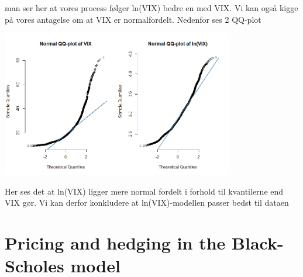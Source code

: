 \documentclass{article}
\theoremstyle{definition}
\theoremstyle{remark}
\begin{document}
man ser her at vores process følger ln(VIX) bedre en med VIX. Vi kan også kigge på vores antagelse om at VIX er normalfordelt. Nedenfor ses 2 QQ-plot
\begin{center}
    \includegraphics[width=4in]{Rplot17.png}
\end{center}
Her ses det at ln(VIX) ligger mere normal fordelt i forhold til kvantilerne end VIX gør. Vi kan derfor konkludere at ln(VIX)-modellen passer bedst til dataen
\section{Pricing and hedging in the Black-Scholes model}
\end{document}

